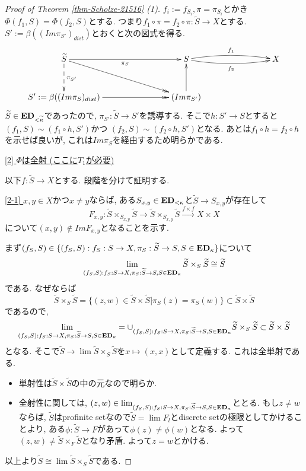 \documentclass[dvipdfmx,a4paper,11pt]{article}
\theoremstyle{definition}
\begin{document}
\begin{proof}[Proof of Theorem \ref{thm-Scholze-21516} (1)]
$f_i := f_{S_i}, \pi = \pi_{S_i}$とかき
$\Phi(f_1, S) = \Phi(f_2, S)$とする.
つまり$f_1 \circ \pi = f_2 \circ \pi : \widetilde{S} \to X$とする. 
$S' := \beta((Im \pi_{S'})_{dist})$とおくと次の図式を得る. 
\begin{equation*}
\xymatrix@C=80pt@R=30pt{
\widetilde{S}
\ar@{-->}[d]^{\pi_{S'}}
\ar@{->>}[rd]
\ar@{->}[r]_{\pi_{S}}
&S
 \ar@/^5pt/[r]^{f_1}
  \ar@/_5pt/[r]_{f_2}
&X
\\
S' := \beta((Im \pi_{S})_{dist}) \ar@{->>}[r]
&(Im \pi_{S'})\ar@{->}[u]
&
 \\   
}
\end{equation*}
$\widetilde{S} \in {\bf ED}_{< \widetilde{\kappa}}$であったので, 
$\pi_{S'} : \widetilde{S} \to S'$を誘導する.
そこで$h : S' \to S$とすると
$(f_1, S) \sim  (f_1 \circ h,S')$かつ
$(f_2, S) \sim  (f_2 \circ h,S')$となる.
あとは$f_1 \circ h = f_2 \circ h$を示せば良いが, これは$Im \pi_{S}$を経由するため明らかである. 

\underline{[2] $\Phi$は全射 (ここに$T_1$が必要) }

以下$f : \widetilde{S} \to X$とする. 
段階を分けて証明する. 

\underline{[2-1] } $x,y \in X$かつ$x \neq y$ならば, ある$S_{x, y} \in {\bf ED}_{<\kappa}$と$ \widetilde{S} \to S_{x,y}$が存在して
$$
F_{x,y} : \widetilde{S} \times_{S_{x,y}}\widetilde{S} 
\longrightarrow
\widetilde{S} \times_{S_{x,y}}\widetilde{S} 
\overset{f \times f}{\longrightarrow}
X \times X
$$
について$(x,y)\not \in Im F_{x,y}$となることを示す. 

まず$(f_S, S) \in \{(f_S, S) : f_S : S \to X, \pi_{S}: \widetilde{S} \to S, S \in {\bf ED}_{\kappa} \}$について
$$
\lim_{(f_S, S) : f_S : S \to X, \pi_{S}: \widetilde{S} \to S, S \in {\bf ED}_{\kappa} }
 \widetilde{S} \times_{S} \widetilde{S}
 \cong 
 \widetilde{S} 
$$
である. なぜならば
$$ \widetilde{S} \times_{S} \widetilde{S}
=
\{ (z,w) \in \widetilde{S} \times \widetilde{S} | \pi_{S}(z) = \pi_{S}(w)\} \subset \widetilde{S} \times \widetilde{S}
$$
であるので, 
$$
\lim_{(f_S, S) : f_S : S \to X, \pi_{S}: \widetilde{S} \to S, S \in {\bf ED}_{\kappa} }
= \cup_{(f_S, S) : f_S : S \to X, \pi_{S}: \widetilde{S} \to S, S \in {\bf ED}_{\kappa} } \widetilde{S} \times_{S} \widetilde{S}
\subset \widetilde{S} \times \widetilde{S}
$$
となる. そこで$\widetilde{S} \to  \lim \widetilde{S} \times_{S} \widetilde{S}$を$x \mapsto (x,x)$として定義する. これは全単射である.
\begin{itemize}
\item 単射性は$\widetilde{S} \times \widetilde{S}$の中の元なので明らか.
 \item 全射性に関しては, $( z, w )\in \lim_{(f_S, S) : f_S : S \to X, \pi_{S}: \widetilde{S} \to S, S \in {\bf ED}_{\kappa} }$ととる. 
もし$z \neq w$ならば, $\widetilde{S}$はprofinite setなので$\widetilde{S} = \lim F_l$とdiscrete setの極限としてかけることより, ある$\phi : \widetilde{S} \to F$があって$\phi(z) \neq \phi(w)$となる. 
よって$(z, w) \neq \widetilde{S} \times_{F} \widetilde{S}$となり矛盾. よって$z=w$とかける. 
\end{itemize}
以上より$\widetilde{S} \cong \lim \widetilde{S} \times_{S} \widetilde{S}$である.


\end{proof}
\end{document}
